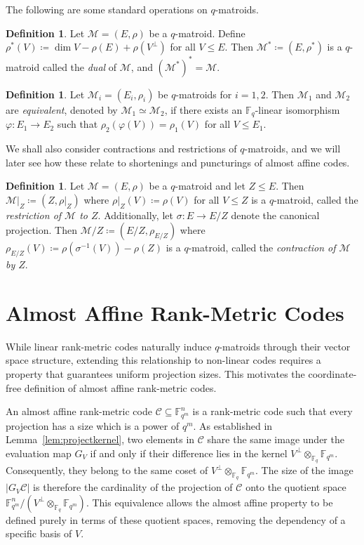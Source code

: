 \documentclass[a4paper,11pt,reqno]{article}
\newcommand{\F}{\mathbb{F}}
\newcommand{\C}{\mathcal{C}}
\theoremstyle{plain} \numberwithin{equation}{section}
\theoremstyle{definition}
\newtheorem{definition}[theorem]{Definition}
\renewcommand{\phi}{\varphi}
\begin{document}
{ The following are some standard operations on $q$-matroids.

\begin{definition}
    Let $\mathcal{M} = (E,\rho)$ be a $q$-matroid. Define $\rho^*(V) \coloneqq \dim V - \rho(E) + \rho(V^{\perp})$ for all $V\leq E$. Then $\mathcal{M}^* \coloneqq (E,\rho^*)$ is a $q$-matroid called the \textit{dual} of $\mathcal{M}$, and $(\mathcal{M}^*)^* = \mathcal{M}$.
\end{definition}}

\begin{definition} \label{def:equivalentmatroids}
Let $\mathcal{M}_i = (E_i, \rho_i)$ be $q$-matroids for $i=1,2$. Then $\mathcal{M}_1$ and $\mathcal{M}_2$ are \textit{equivalent}, denoted by $\mathcal{M}_1 \simeq \mathcal{M}_2$, if there exists an $\mathbb{F}_q$-linear isomorphism $\phi \colon E_1 \rightarrow E_2$ such that $\rho_2(\phi(V)) = \rho_1(V)$ for all $V\leq E_1$. 
\end{definition}

We shall also consider contractions and restrictions of $q$-matroids, and we will later see how these relate to shortenings and puncturings of almost affine codes.

\begin{definition} Let $\mathcal{M} = (E,\rho)$ be a $q$-matroid and let $Z\leq E$. Then $\mathcal{M}|_Z \coloneqq (Z,\rho|_{Z})$ where $\rho|_{Z}(V) \coloneqq \rho(V)$ for all $V\leq Z$ is a $q$-matroid, called the \textit{restriction of $\mathcal{M}$ to $Z$}. Additionally, let $\sigma \colon E\rightarrow E/Z$ denote the canonical projection. Then $\mathcal{M}/Z \coloneqq (E/Z,\rho_{E/Z})$ where $\rho_{E/Z}(V) \coloneqq \rho(\sigma ^{-1}(V))-\rho(Z)$ is a $q$-matroid, called the \textit{contraction of $\mathcal{M}$ by $Z$}.
\end{definition}

\section{Almost Affine Rank-Metric Codes} \label{sec:aa}


While linear rank-metric codes naturally induce $q$-matroids through their vector space structure, extending this relationship to non-linear codes requires a property that guarantees uniform projection sizes. This motivates the coordinate-free definition of almost affine rank-metric codes.

An almost affine rank-metric code $\C\subseteq \F_{q^m}^n$ is a rank-metric code such that every projection has a size which is a power of $q^m$. As established in Lemma~\ref{lem:projectkernel}, two elements in $\C$ share the same image under the evaluation map $G_V$ if and only if their difference lies in the kernel $V^\perp \otimes_{\F_q} \F_{q^m}$. Consequently, they belong to the same coset of $V^\perp \otimes_{\F_q} \F_{q^m}$. The size of the image $|G_V\C|$ is therefore the cardinality of the projection of $\C$ onto the quotient space $\F_{q^m}^n /(V^\perp \otimes_{\F_q} \F_{q^m})$. This equivalence allows the almost affine property to be defined purely in terms of these quotient spaces, removing the dependency of a specific basis of $V$.
\end{document}
